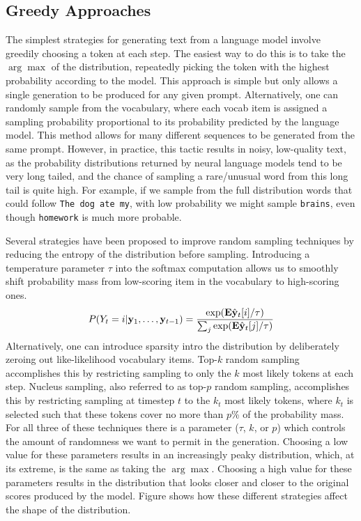 \subsection{Greedy Approaches}
The simplest strategies for generating text from a language model involve greedily choosing a token at each step.
The easiest way to do this is to take the $\arg \max$ of the distribution, repeatedly picking the token with the highest probability according to the model.
This approach is simple but only allows a single generation to be produced for any given prompt.
Alternatively, one can randomly sample from the vocabulary, where each vocab item is assigned a sampling probability proportional to its probability predicted by the language model.
This method allows for many different sequences to be generated from the same prompt.
However, in practice, this tactic results in noisy, low-quality text, as the probability distributions returned by neural language models tend to be very long tailed, and the chance of sampling a rare/unusual word from this long tail is quite high. For example, if we sample from the full distribution words that could follow \texttt{The dog ate my}, with low probability we might sample \texttt{brains}, even though \texttt{homework} is much more probable.

Several strategies have been proposed to improve random sampling techniques by reducing the entropy of the distribution before sampling.
Introducing a temperature parameter $\tau$ into the softmax computation allows us to smoothly shift probability mass from low-scoring item in the vocabulary to high-scoring ones.
\begin{align}
    \label{equation:softmax_with_temp}
    P(Y_t=i | \mathbf{y}_1, \ldots, \mathbf{y}_{t-1}) = \frac{\exp(\mathbf{E}\hat{\mathbf{y}}_t[i]/\tau)}{\sum_j\exp(\mathbf{E}\hat{\mathbf{y}}_t[j]/\tau)}
\end{align}
Alternatively, one can introduce sparsity intro the distribution by deliberately zeroing out like-likelihood vocabulary items.
Top-$k$ random sampling accomplishes this by restricting sampling to only the $k$ most likely tokens at each step.
Nucleus sampling, also referred to as top-$p$ random sampling, accomplishes this by restricting sampling at timestep $t$ to the $k_t$ most likely tokens, where $k_t$ is selected such that these tokens cover no more than $p$\% of the probability mass.
For all three of these techniques there is a parameter ($\tau$, $k$, or $p$) which controls the amount of randomness we want to permit in the generation.
Choosing a low value for these parameters results in an increasingly peaky distribution, which, at its extreme, is the same as taking the $\arg \max$. 
Choosing a high value for these parameters results in the distribution that looks closer and closer to the original scores produced by the model.
Figure  shows how these different strategies affect the shape of the distribution.

